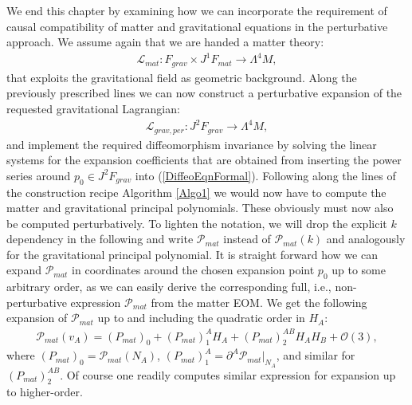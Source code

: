 We end this chapter by examining how we can incorporate the requirement of causal compatibility of matter and gravitational equations in the perturbative approach.
We assume again that we are handed a matter theory: 
\begin{align}
    \mathcal{L}_{mat} : F_{grav} \times J^1F_{mat} \longrightarrow \Lambda^4M,
\end{align}
that exploits the gravitational field as geometric background. Along the previously prescribed lines we can now construct a perturbative expansion of the requested gravitational Lagrangian:
\begin{align}
    \mathcal{L}_{grav,per} : J^2F_{grav} \longrightarrow \Lambda^4M,
\end{align}
and implement the required diffeomorphism invariance by solving the linear systems for the expansion coefficients that are obtained from inserting the power series around $p_0 \in J^2F_{grav}$ into (\ref{DiffeoEqnFormal}). 
Following along the lines of the construction recipe Algorithm \ref{Algo1} we would now have to compute the matter and gravitational principal polynomials.
These obviously must now also be computed perturbatively. 
To lighten the notation, we will drop the explicit $k$ dependency in the following and write $\mathcal{P}_{mat}$ instead of $\mathcal{P}_{mat}(k)$ and analogously for the gravitational principal polynomial. It is straight forward how we can expand $\mathcal{P}_{mat}$ in coordinates around the chosen expansion point $p_0$ up to some arbitrary order, as we can easily derive the corresponding full, i.e., non-perturbative expression $\mathcal{P}_{mat}$ from the matter EOM. We get the following expansion of $\mathcal{P}_{mat}$ up to and including the quadratic order in $H_A$:
\begin{align}
    \mathcal{P}_{mat}(v_A) = (P_{mat})_{0} + (P_{mat})^A_1 H_A+ (P_{mat})^{AB}_2 H_A H_B +\mathcal{O}(3),
\end{align}
where $(P_{mat})_0 = \mathcal{P}_{mat}(N_A)$, $(P_{mat})_1^A = \partial^A \mathcal{P}_{mat} \vert _{N_A}$, and similar for $(P_{mat})^{AB}_2$. Of course one readily computes similar expression for expansion up to higher-order. 

